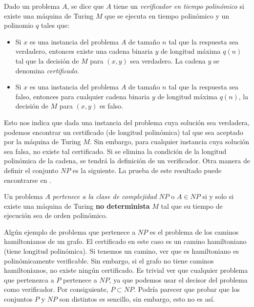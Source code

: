 \begin{definition}
    Dado un problema $A$, se dice que $A$ tiene un \textit{verificador en tiempo polinómico} si existe una máquina de Turing $M$ que se ejecuta en tiempo polinómico y un polinomio $q$ tales que:
    \begin{itemize}
        \item Si $x$ es una instancia del problema $A$ de tamaño $n$ tal que la respuesta sea verdadero, entonces existe una cadena binaria $y$ de longitud máxima $q(n)$ tal que la decisión de $M$ para $(x,y)$ sea verdadero. La cadena $y$ se denomina \textit{certificado}.
        \item Si $x$ es una instancia del problema $A$ de tamaño $n$ tal que la respuesta sea falso, entonces para cualquier cadena binaria $y$ de longitud máxima $q(n)$, la decisión de $M$ para $(x,y)$ es falso. 
    \end{itemize}
\end{definition}

Esto nos indica que dada una instancia del problema cuya solución sea verdadera, podemos encontrar un certificado (de longitud polinómica) tal que sea aceptado por la máquina de Turing $M$. Sin embargo, para cualquier instancia cuya solución sea falsa, no existe tal certificado. Si se elimina la condición de la longitud polinómica de la cadena, se tendrá la definición de un verificador. Otra manera de definir el conjunto $NP$ es la siguiente. La prueba de este resultado puede encontrarse en \cite{sipser-cc}.

\begin{theorem}
    Un problema $A$ \textit{pertenece a la clase de complejidad} $NP$ o $A\in NP$ si y solo si existe una máquina de Turing \textbf{no determinista} $M$ tal que su tiempo de ejecución sea de orden polinómico.
\end{theorem}

Algún ejemplo de problema que pertenece a $NP$ es el problema de los caminos hamiltonianos de un grafo. El certificado en este caso es un camino hamiltoniano (tiene longitud polinómica). Si tenemos un camino, ver que es hamiltoniano es polinómicamente verificable. Sin embargo, si el grafo no tiene caminos hamiltonianos, no existe ningún certificado. Es trivial ver que cualquier problema que pertenezca a $P$ pertenece a $NP$, ya que podemos usar el decisor del problema como verificador. Por consiguiente, $P\subset NP$. Podría parecer que probar que los conjuntos $P$ y $NP$ son distintos es sencillo, sin embargo, esto no es así.

